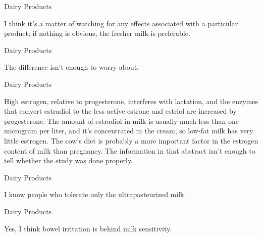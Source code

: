 \documentclass[11pt,oneside,openany,extrafontsizes]{memoir}
\begin{document}
\begin{standalonequote}{Dairy Products}

    \begin{answer}
        I think it's a matter of watching for any effects associated with a particular product; if nothing is obvious, the fresher milk is preferable.
    \end{answer}
\end{standalonequote}

\begin{standalonequote}{Dairy Products}

    \begin{answer}
        The difference isn't enough to worry about.
    \end{answer}
\end{standalonequote}

\begin{standalonequote}{Dairy Products}

    \begin{answer}
        High estrogen, relative to progesterone, interferes with lactation, and the enzymes that convert estradiol to the less active estrone and estriol are increased by progesterone. The amount of estradiol in milk is usually much less than one microgram per liter, and it's concentrated in the cream, so low-fat milk has very little estrogen. The cow's diet is probably a more important factor in the estrogen content of milk than pregnancy. The information in that abstract isn't enough to tell whether the study was done properly.
    \end{answer}
\end{standalonequote}

\begin{standalonequote}{Dairy Products}

    \begin{answer}
        I know people who tolerate only the ultrapasteurized milk.
    \end{answer}
\end{standalonequote}

\begin{standalonequote}{Dairy Products}

    \begin{answer}
        Yes, I think bowel irritation is behind milk sensitivity.
    \end{answer}
\end{standalonequote}
\end{document}
